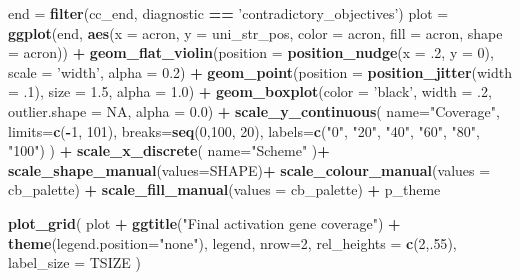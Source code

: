 \documentclass[]{book}
\newenvironment{Shaded}{\begin{snugshade}}{\end{snugshade}}
\newcommand{\DataTypeTok}[1]{\textcolor[rgb]{0.13,0.29,0.53}{#1}}
\newcommand{\DecValTok}[1]{\textcolor[rgb]{0.00,0.00,0.81}{#1}}
\newcommand{\FloatTok}[1]{\textcolor[rgb]{0.00,0.00,0.81}{#1}}
\newcommand{\KeywordTok}[1]{\textcolor[rgb]{0.13,0.29,0.53}{\textbf{#1}}}
\newcommand{\NormalTok}[1]{#1}
\newcommand{\OperatorTok}[1]{\textcolor[rgb]{0.81,0.36,0.00}{\textbf{#1}}}
\newcommand{\OtherTok}[1]{\textcolor[rgb]{0.56,0.35,0.01}{#1}}
\newcommand{\StringTok}[1]{\textcolor[rgb]{0.31,0.60,0.02}{#1}}
\begin{document}
\begin{Shaded}
\begin{Highlighting}[]
\NormalTok{end =}\StringTok{ }\KeywordTok{filter}\NormalTok{(cc_end, diagnostic }\OperatorTok{==}\StringTok{ 'contradictory_objectives'}\NormalTok{)}
\NormalTok{plot =}\StringTok{ }\KeywordTok{ggplot}\NormalTok{(end, }\KeywordTok{aes}\NormalTok{(}\DataTypeTok{x =}\NormalTok{ acron, }\DataTypeTok{y =}\NormalTok{ uni_str_pos, }\DataTypeTok{color =}\NormalTok{ acron, }\DataTypeTok{fill =}\NormalTok{ acron, }\DataTypeTok{shape =}\NormalTok{ acron)) }\OperatorTok{+}
\StringTok{  }\KeywordTok{geom_flat_violin}\NormalTok{(}\DataTypeTok{position =} \KeywordTok{position_nudge}\NormalTok{(}\DataTypeTok{x =} \FloatTok{.2}\NormalTok{, }\DataTypeTok{y =} \DecValTok{0}\NormalTok{), }\DataTypeTok{scale =} \StringTok{'width'}\NormalTok{, }\DataTypeTok{alpha =} \FloatTok{0.2}\NormalTok{) }\OperatorTok{+}
\StringTok{  }\KeywordTok{geom_point}\NormalTok{(}\DataTypeTok{position =} \KeywordTok{position_jitter}\NormalTok{(}\DataTypeTok{width =} \FloatTok{.1}\NormalTok{), }\DataTypeTok{size =} \FloatTok{1.5}\NormalTok{, }\DataTypeTok{alpha =} \FloatTok{1.0}\NormalTok{) }\OperatorTok{+}
\StringTok{  }\KeywordTok{geom_boxplot}\NormalTok{(}\DataTypeTok{color =} \StringTok{'black'}\NormalTok{, }\DataTypeTok{width =} \FloatTok{.2}\NormalTok{, }\DataTypeTok{outlier.shape =} \OtherTok{NA}\NormalTok{, }\DataTypeTok{alpha =} \FloatTok{0.0}\NormalTok{) }\OperatorTok{+}
\StringTok{  }\KeywordTok{scale_y_continuous}\NormalTok{(}
    \DataTypeTok{name=}\StringTok{"Coverage"}\NormalTok{,}
    \DataTypeTok{limits=}\KeywordTok{c}\NormalTok{(}\OperatorTok{-}\DecValTok{1}\NormalTok{, }\DecValTok{101}\NormalTok{),}
    \DataTypeTok{breaks=}\KeywordTok{seq}\NormalTok{(}\DecValTok{0}\NormalTok{,}\DecValTok{100}\NormalTok{, }\DecValTok{20}\NormalTok{),}
    \DataTypeTok{labels=}\KeywordTok{c}\NormalTok{(}\StringTok{"0"}\NormalTok{, }\StringTok{"20"}\NormalTok{, }\StringTok{"40"}\NormalTok{, }\StringTok{"60"}\NormalTok{, }\StringTok{"80"}\NormalTok{, }\StringTok{"100"}\NormalTok{)}
\NormalTok{  ) }\OperatorTok{+}
\StringTok{  }\KeywordTok{scale_x_discrete}\NormalTok{(}
    \DataTypeTok{name=}\StringTok{"Scheme"}
\NormalTok{  )}\OperatorTok{+}
\StringTok{  }\KeywordTok{scale_shape_manual}\NormalTok{(}\DataTypeTok{values=}\NormalTok{SHAPE)}\OperatorTok{+}
\StringTok{  }\KeywordTok{scale_colour_manual}\NormalTok{(}\DataTypeTok{values =}\NormalTok{ cb_palette) }\OperatorTok{+}
\StringTok{  }\KeywordTok{scale_fill_manual}\NormalTok{(}\DataTypeTok{values =}\NormalTok{ cb_palette) }\OperatorTok{+}
\StringTok{  }\NormalTok{p_theme}

\KeywordTok{plot_grid}\NormalTok{(}
\NormalTok{  plot }\OperatorTok{+}
\StringTok{    }\KeywordTok{ggtitle}\NormalTok{(}\StringTok{"Final activation gene coverage"}\NormalTok{) }\OperatorTok{+}
\StringTok{    }\KeywordTok{theme}\NormalTok{(}\DataTypeTok{legend.position=}\StringTok{"none"}\NormalTok{),}
\NormalTok{  legend,}
  \DataTypeTok{nrow=}\DecValTok{2}\NormalTok{,}
  \DataTypeTok{rel_heights =} \KeywordTok{c}\NormalTok{(}\DecValTok{2}\NormalTok{,.}\DecValTok{55}\NormalTok{),}
  \DataTypeTok{label_size =}\NormalTok{ TSIZE}
\NormalTok{)}
\end{Highlighting}
\end{Shaded}
\end{document}
